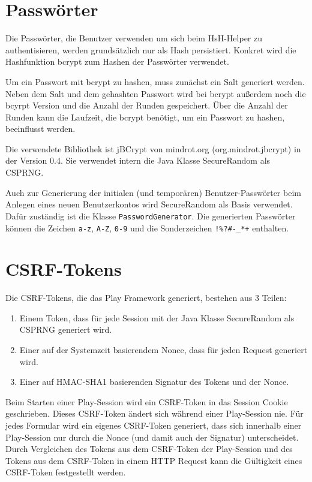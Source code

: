 \documentclass[12pt,DIV14,BCOR10mm,a4paper,parskip=half-,headsepline,headinclude,english,ngerman,bibliography=totocnumbered]{scrreprt}
\begin{document}
\section{Passwörter}
Die Passwörter, die Benutzer verwenden um sich beim HsH-Helper zu authentisieren, werden grundsätzlich nur als Hash persistiert. Konkret wird die Hashfunktion bcrypt zum Hashen der Passwörter verwendet.

Um ein Passwort mit bcrypt zu hashen, muss zunächst ein Salt generiert werden. Neben dem Salt und dem gehashten Passwort wird bei bcrypt außerdem noch die bcyrpt Version und die Anzahl der Runden gespeichert. Über die Anzahl der Runden kann die Laufzeit, die bcrypt benötigt, um ein Passwort zu hashen, beeinflusst werden.

Die verwendete Bibliothek ist jBCrypt von mindrot.org (org.mindrot.jbcrypt) in der Version 0.4. Sie verwendet intern die Java Klasse SecureRandom als CSPRNG.

Auch zur Generierung der initialen (und temporären) Benutzer-Passwörter beim Anlegen eines neuen Benutzerkontos wird SecureRandom als Basis verwendet. Dafür zuständig ist die Klasse \texttt{PasswordGenerator}. Die generierten Passwörter können die Zeichen \texttt{a-z}, \texttt{A-Z}, \texttt{0-9} und die Sonderzeichen \texttt{!\%?\#-\_*+} enthalten.

\section{CSRF-Tokens}
Die CSRF-Tokens, die das Play Framework generiert, bestehen aus 3 Teilen:
\begin{enumerate}
\item Einem Token, dass für jede Session mit der Java Klasse SecureRandom als CSPRNG generiert wird.
\item Einer auf der Systemzeit basierendem Nonce, dass für jeden Request generiert wird.
\item Einer auf HMAC-SHA1 basierenden Signatur des Tokens und der Nonce.
\end{enumerate}

Beim Starten einer Play-Session wird ein CSRF-Token in das Session Cookie geschrieben. Dieses CSRF-Token ändert sich während einer Play-Session nie. Für jedes Formular wird ein eigenes CSRF-Token generiert, dass sich innerhalb einer Play-Session nur durch die Nonce (und damit auch der Signatur) unterscheidet. Durch Vergleichen des Tokens aus dem CSRF-Token der Play-Session und des Tokens aus dem CSRF-Token in einem HTTP Request kann die Gültigkeit eines CSRF-Token festgestellt werden.
\end{document}
